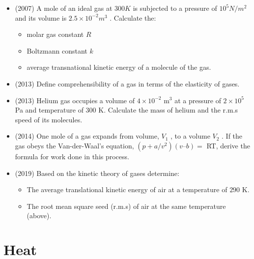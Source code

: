 \documentclass{article}
\begin{document}
\begin{itemize}
\item (2007)  A mole of an ideal gas at $ 300K$ is subjected to a pressure of $ 10^{5}N/m^{2}$ and its volume is $ 2.5 \times 10^{-2}m^{3}$ .  Calculate the:\begin{itemize}
\item molar gas constant $ R$
\item Boltzmann constant $ k$
\item average transnational kinetic energy of a molecule of the gas.
\end{itemize}
\item (2013)  Define comprehensibility of a gas in terms of the elasticity of gases. 
\item (2013)  Helium gas occupies a volume of $ 4 \times 10^{-2}$ m$ ^{3}$ at a pressure of $ 2 \times 10^{5}$ Pa and temperature of $ 300$ K. Calculate the mass of helium and the r.m.s speed of its molecules.
\item (2014)  One mole of a gas expands from volume, $ V_{1}$ , to a volume $ V_{2}$ . If the gas obeys the Van-der-Waal’s equation, $ (p+ a/v^{2})(v – b)=$ RT, derive the formula for work done in this process.
\item (2019)  Based on the kinetic theory of gases determine:\begin{itemize}
\item The average translational kinetic energy of air at a temperature of $ 290$ K.
\item The root mean square seed (r.m.s) of air at the same temperature (above).
\end{itemize}
\end{itemize}


\section{Heat}
\end{document}
